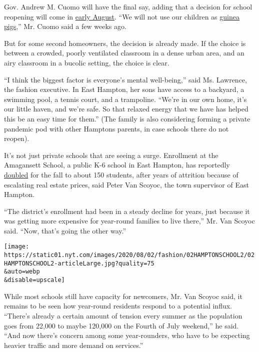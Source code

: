Gov. Andrew M. Cuomo will have the final say, adding that a decision for
school reopening will come in
\href{https://www.nbcnewyork.com/news/coronavirus/nyc-to-ask-state-for-extension-on-specific-back-to-school-plans/2540164/}{early
August}. ``We will not use our children as
\href{https://www.cnbc.com/video/2020/07/13/new-york-gov-cuomo-on-reopening-schools-were-not-going-to-use-our-children-as-guinea-pigs.html}{guinea
pigs},'' Mr. Cuomo said a few weeks ago.

But for some second homeowners, the decision is already made. If the
choice is between a crowded, poorly ventilated classroom in a dense
urban area, and an airy classroom in a bucolic setting, the choice is
clear.

``I think the biggest factor is everyone's mental well-being,'' said Ms.
Lawrence, the fashion executive. In East Hampton, her sons have access
to a backyard, a swimming pool, a tennis court, and a trampoline.
``We're in our own home, it's our little haven, and we're safe. So that
relaxed energy that we have has helped this be an easy time for them.''
(The family is also considering forming a private pandemic pod with
other Hamptons parents, in case schools there do not reopen).

It's not just private schools that are seeing a surge. Enrollment at the
Amagansett School, a public K-6 school in East Hampton, has reportedly
\href{https://www.easthamptonstar.com/education/2020716/amagansett-school-expects-enrollment-to-double}{doubled}
for the fall to about 150 students, after years of attrition because of
escalating real estate prices, said Peter Van Scoyoc, the town
supervisor of East Hampton.

``The district's enrollment had been in a steady decline for years, just
because it was getting more expensive for year-round families to live
there,'' Mr. Van Scoyoc said. ``Now, that's going the other way.''

\texttt{[image: https://static01.nyt.com/images/2020/08/02/fashion/02HAMPTONSCHOOL2/02HAMPTONSCHOOL2-articleLarge.jpg?quality=75\\\&auto=webp\\\&disable=upscale]}

While most schools still have capacity for newcomers, Mr. Van Scoyoc
said, it remains to be seen how year-round residents respond to a
potential influx. ``There's already a certain amount of tension every
summer as the population goes from 22,000 to maybe 120,000 on the Fourth
of July weekend,'' he said. ``And now there's concern among some
year-rounders, who have to be expecting heavier traffic and more demand
on services.''

